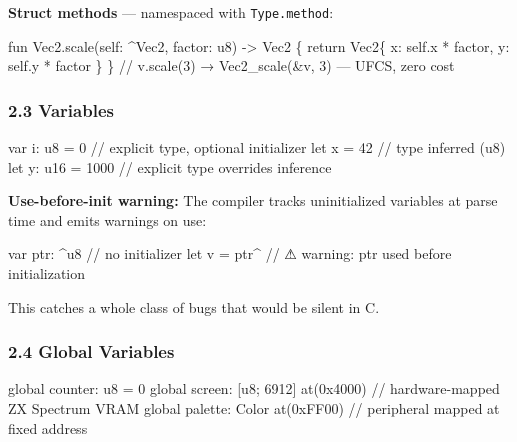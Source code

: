 \documentclass[
  11pt,
  a4paper,
]{report}
\newenvironment{Shaded}{\begin{snugshade}\small}{\end{snugshade}}
\newcommand{\NormalTok}[1]{#1}
\begin{document}
\textbf{Struct methods} --- namespaced with \texttt{Type.method}:

\begin{Shaded}
\begin{Highlighting}[]
\NormalTok{fun Vec2.scale(self: \^{}Vec2, factor: u8) {-}\textgreater{} Vec2 \{}
\NormalTok{    return Vec2\{ x: self.x * factor, y: self.y * factor \}}
\NormalTok{\}}
\NormalTok{// v.scale(3) → Vec2\_scale(\&v, 3)  — UFCS, zero cost}
\end{Highlighting}
\end{Shaded}

\subsubsection{2.3 Variables}\label{variables}

\begin{Shaded}
\begin{Highlighting}[]
\NormalTok{var i: u8 = 0       // explicit type, optional initializer}
\NormalTok{let x = 42          // type inferred (u8)}
\NormalTok{let y: u16 = 1000   // explicit type overrides inference}
\end{Highlighting}
\end{Shaded}

\textbf{Use-before-init warning:} The compiler tracks uninitialized
variables at parse time and emits warnings on use:

\begin{Shaded}
\begin{Highlighting}[]
\NormalTok{var ptr: \^{}u8          // no initializer}
\NormalTok{let v = ptr\^{}          // ⚠ warning: ptr used before initialization}
\end{Highlighting}
\end{Shaded}

This catches a whole class of bugs that would be silent in C.

\subsubsection{2.4 Global Variables}\label{global-variables}

\begin{Shaded}
\begin{Highlighting}[]
\NormalTok{global counter: u8 = 0}
\NormalTok{global screen: [u8; 6912] at(0x4000)   // hardware{-}mapped ZX Spectrum VRAM}
\NormalTok{global palette: Color at(0xFF00)        // peripheral mapped at fixed address}
\end{Highlighting}
\end{Shaded}
\end{document}
